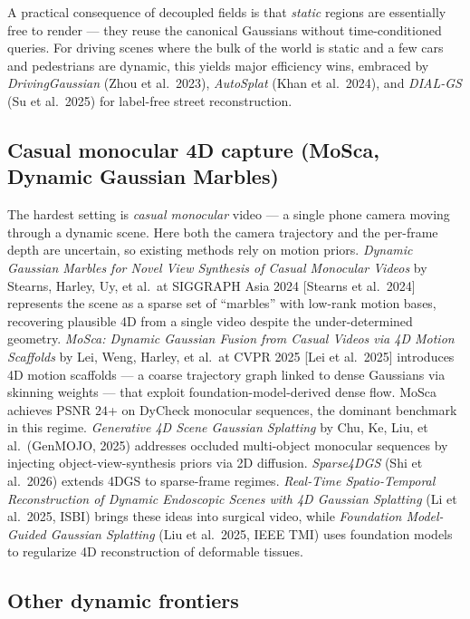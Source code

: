 A practical consequence of decoupled fields is that \emph{static} regions are essentially free to render --- they reuse the canonical Gaussians without time-conditioned queries. For driving scenes where the bulk of the world is static and a few cars and pedestrians are dynamic, this yields major efficiency wins, embraced by \emph{DrivingGaussian} (Zhou et al.~2023), \emph{AutoSplat} (Khan et al.~2024), and \emph{DIAL-GS} (Su et al.~2025) for label-free street reconstruction.

\subsection{Casual monocular 4D capture (MoSca, Dynamic Gaussian Marbles)}\label{casual-monocular-4d-capture-mosca-dynamic-gaussian-marbles}

The hardest setting is \emph{casual monocular} video --- a single phone camera moving through a dynamic scene. Here both the camera trajectory and the per-frame depth are uncertain, so existing methods rely on motion priors. \emph{Dynamic Gaussian Marbles for Novel View Synthesis of Casual Monocular Videos} by Stearns, Harley, Uy, et al.~at SIGGRAPH Asia 2024 {[}Stearns et al.~2024{]} represents the scene as a sparse set of ``marbles'' with low-rank motion bases, recovering plausible 4D from a single video despite the under-determined geometry. \emph{MoSca: Dynamic Gaussian Fusion from Casual Videos via 4D Motion Scaffolds} by Lei, Weng, Harley, et al.~at CVPR 2025 {[}Lei et al.~2025{]} introduces 4D motion scaffolds --- a coarse trajectory graph linked to dense Gaussians via skinning weights --- that exploit foundation-model-derived dense flow. MoSca achieves PSNR \(24\)+ on DyCheck monocular sequences, the dominant benchmark in this regime. \emph{Generative 4D Scene Gaussian Splatting} by Chu, Ke, Liu, et al.~(GenMOJO, 2025) addresses occluded multi-object monocular sequences by injecting object-view-synthesis priors via 2D diffusion. \emph{Sparse4DGS} (Shi et al.~2026) extends 4DGS to sparse-frame regimes. \emph{Real-Time Spatio-Temporal Reconstruction of Dynamic Endoscopic Scenes with 4D Gaussian Splatting} (Li et al.~2025, ISBI) brings these ideas into surgical video, while \emph{Foundation Model-Guided Gaussian Splatting} (Liu et al.~2025, IEEE TMI) uses foundation models to regularize 4D reconstruction of deformable tissues.

\subsection{Other dynamic frontiers}\label{other-dynamic-frontiers}

